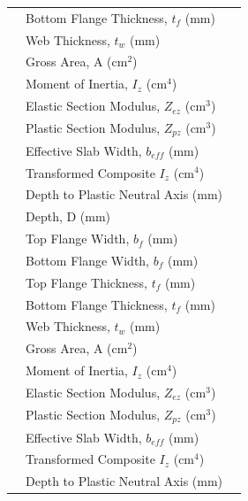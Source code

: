 \documentclass[12pt,a4paper]{report}
\numberwithin{table}{chapter}
\numberwithin{figure}{chapter}
\newcommand{\reportrowpad}{4pt}
\begin{document}
\begin{longtable}{|C{2.5cm}|L{8.0cm}|>{\centering\arraybackslash}p{5.0cm}|}
 & \textnormal{Bottom Flange Thickness, $t_f$ (mm)} &  \\[\reportrowpad]
 & \textnormal{Web Thickness, $t_w$ (mm)} &  \\[\reportrowpad]
 & \textnormal{Gross Area, A (cm$^2$)} &  \\[\reportrowpad]
 & \textnormal{Moment of Inertia, $I_z$ (cm$^4$)} &  \\[\reportrowpad]
 & \textnormal{Elastic Section Modulus, $Z_{ez}$ (cm$^3$)} &  \\[\reportrowpad]
 & \textnormal{Plastic Section Modulus, $Z_{pz}$ (cm$^3$)} &  \\[\reportrowpad]
 & \textnormal{Effective Slab Width, $b_{eff}$ (mm)} &  \\[\reportrowpad]
 & \textnormal{Transformed Composite $I_z$ (cm$^4$)} &  \\[\reportrowpad]
 & \textnormal{Depth to Plastic Neutral Axis (mm)} &  \\[\reportrowpad]
\hline
{} & \textnormal{Depth, D (mm)} &  \\[\reportrowpad]
 & \textnormal{Top Flange Width, $b_f$ (mm)} &  \\[\reportrowpad]
 & \textnormal{Bottom Flange Width, $b_f$ (mm)} &  \\[\reportrowpad]
 & \textnormal{Top Flange Thickness, $t_f$ (mm)} &  \\[\reportrowpad]
 & \textnormal{Bottom Flange Thickness, $t_f$ (mm)} &  \\[\reportrowpad]
 & \textnormal{Web Thickness, $t_w$ (mm)} &  \\[\reportrowpad]
 & \textnormal{Gross Area, A (cm$^2$)} &  \\[\reportrowpad]
 & \textnormal{Moment of Inertia, $I_z$ (cm$^4$)} &  \\[\reportrowpad]
 & \textnormal{Elastic Section Modulus, $Z_{ez}$ (cm$^3$)} &  \\[\reportrowpad]
 & \textnormal{Plastic Section Modulus, $Z_{pz}$ (cm$^3$)} &  \\[\reportrowpad]
 & \textnormal{Effective Slab Width, $b_{eff}$ (mm)} &  \\[\reportrowpad]
 & \textnormal{Transformed Composite $I_z$ (cm$^4$)} &  \\[\reportrowpad]
 & \textnormal{Depth to Plastic Neutral Axis (mm)} &  \\[\reportrowpad]

\end{longtable}
\end{document}

